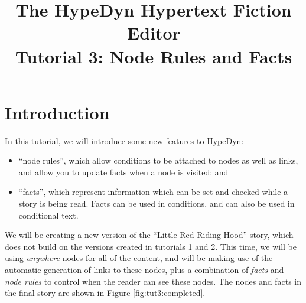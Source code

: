 \documentclass{article}
\begin{document}
\title{The HypeDyn Hypertext Fiction Editor\\Tutorial 3: Node Rules and Facts}
\date{}

\onecolumn
\maketitle

\tableofcontents

\section{Introduction}
In this tutorial, we will introduce some new features to HypeDyn:

\begin{itemize}
  \item ``node rules'', which allow conditions to be attached to nodes as well
  as links, and allow you to update facts when a node is visited; and
  \item ``facts'', which represent information which can be set and checked
  while a story is being read. Facts can be used in conditions, and can also be
  used in conditional text.
\end{itemize}



\noindent We will be creating a new version of the ``Little Red Riding Hood''
story, which does not build on the versions created in tutorials 1 and 2. This
time, we will be using \textit{anywhere} nodes for all of the content, and will
be making use of the automatic generation of links to these nodes, plus a
combination of \textit{facts} and \textit{node rules} to control when the reader
can see these nodes. The nodes and facts in the final story are shown in Figure
\ref{fig:tut3:completed}.
\end{document}
